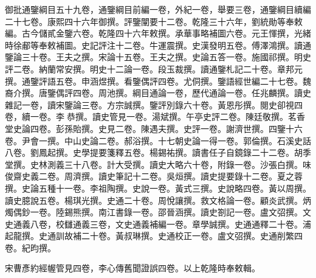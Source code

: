 \begin{pinyinscope}
御批通鑒綱目五十九卷，通鑒綱目前編一卷，外紀一卷，舉要三卷，通鑒綱目續編二十七卷。康熙四十六年御撰。評鑒闡要十二卷。乾隆三十六年，劉統勛等奉敕編。古今儲貳金鑒六卷。乾隆四十六年敕撰。承華事略補圖六卷。元王惲撰，光緒時徐郙等奉敕補圖。史記評注十二卷。牛運震撰。史漢發明五卷。傅澤鴻撰。讀通鑒論三十卷。王夫之撰。宋論十五卷。王夫之撰。史論五答一卷。施國祁撰。明史評二卷。納蘭常安撰。明史十二論一卷。段玉裁撰。讀通鑒札記二十卷。章邦元撰。通鑒評語五卷。申涵煜撰。看鑒偶評四卷。尤侗撰。鑒語經世編二十七卷。魏裔介撰。唐鑒偶評四卷。周池撰。綱目通論一卷，歷代通論一卷。任兆麟撰。讀史雜記一卷，讀宋鑒論三卷。方宗誠撰。鑒評別錄六十卷。黃恩彤撰。閱史卻視四卷，續一卷。李恭撰。讀史管見一卷。湯斌撰。午亭史評二卷。陳廷敬撰。茗香堂史論四卷。彭孫貽撰。史見二卷。陳遇夫撰。史評一卷。謝濟世撰。四鑒十六卷。尹會一撰。中山史論二卷。郝浴撰。十七朝史論一得一卷。郭倫撰。石溪史話八卷。劉鳳起撰。史學提要箋釋五卷。楊錫祐撰。讀書任子自鏡錄二十二卷。胡季堂撰。史林測義三十八卷。計大受撰。讀史大略六十卷，附錄一卷。沙張白撰。味俊齋史義二卷。周濟撰。讀史筆記十二卷。吳烜撰。讀史提要錄十二卷。夏之蓉撰。史論五種十一卷。李祖陶撰。史說一卷。黃式三撰。史說略四卷。黃以周撰。讀史臆說五卷。楊琪光撰。史通二十卷。周悅讓撰。救文格論一卷。顧炎武撰。炳燭偶鈔一卷。陸錫熊撰。南江書錄一卷。邵晉涵撰。讀史劄記一卷。盧文弨撰。文史通義八卷，校讎通義三卷，文史通義補編一卷。章學誠撰。史通通釋二十卷。浦起龍撰。史通訓故補二十卷。黃叔琳撰。史通校正一卷。盧文弨撰。史通削繁四卷。紀昀撰。

宋曹彥約經幄管見四卷，李心傳舊聞證誤四卷。以上乾隆時奉敕輯。


\end{pinyinscope}